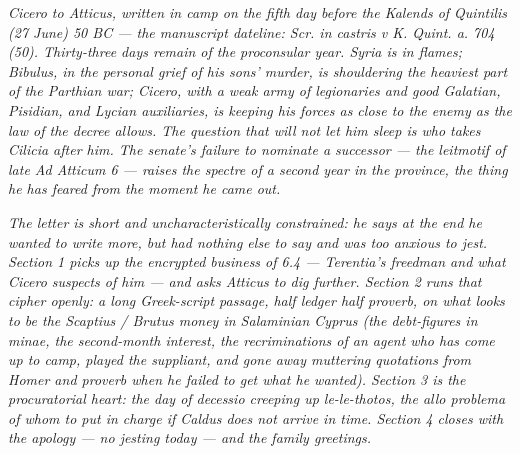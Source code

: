 
\textit{Cicero to Atticus, written in camp on the
fifth day before the Kalends of Quintilis (27 June) 50
BC --- the manuscript dateline: \textit{Scr. in castris
v K. Quint. a. 704 (50)}. Thirty-three days remain of
the proconsular year. Syria is in flames; Bibulus, in
the personal grief of his sons' murder, is shouldering
the heaviest part of the Parthian war; Cicero, with a
weak army of legionaries and good Galatian, Pisidian,
and Lycian auxiliaries, is keeping his forces as close
to the enemy as the law of the decree allows. The
question that will not let him sleep is who takes
Cilicia after him. The senate's failure to nominate a
successor --- the leitmotif of late \textit{Ad Atticum}
6 --- raises the spectre of a second year in the
province, the thing he has feared from the moment he
came out.}

\textit{The letter is short and uncharacteristically
constrained: he says at the end he wanted to write
more, but had nothing else to say and was too anxious
to jest. Section 1 picks up the encrypted business of
6.4 --- Terentia's freedman and what Cicero suspects of
him --- and asks Atticus to dig further. Section 2
runs that cipher openly: a long Greek-script passage,
half ledger half proverb, on what looks to be the
Scaptius / Brutus money in Salaminian Cyprus (the
debt-figures in minae, the second-month interest, the
recriminations of an agent who has come up to camp,
played the suppliant, and gone away muttering quotations
from Homer and proverb when he failed to get what he
wanted). Section 3 is the procuratorial heart: the
day of decessio creeping up \textit{le-le-thotos}, the
\textit{allo problema} of whom to put in charge if
Caldus does not arrive in time. Section 4 closes with
the apology --- no jesting today --- and the family
greetings.}

